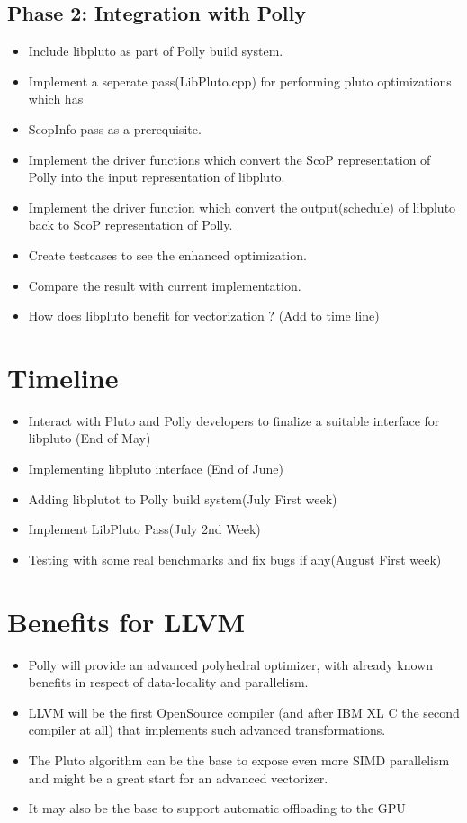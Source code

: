 \documentclass[a4paper,12pt]{article}
\begin{document}
\subsection{Phase 2: Integration with Polly}
\begin{itemize}
\item Include libpluto as part of Polly build system.
\item  Implement a seperate pass(LibPluto.cpp) for performing pluto optimizations which has
\item ScopInfo pass as a prerequisite.
\item Implement the driver functions which convert the ScoP representation
      of Polly into the input representation of libpluto.
\item Implement the driver function which convert the output(schedule) of
      libpluto back to ScoP representation of Polly.
\item Create testcases to see the enhanced optimization.
\item Compare the result with current implementation.
\item How does libpluto benefit for vectorization ? (Add to time line)
\end{itemize}

\section{Timeline}

\begin{itemize}
\item Interact with Pluto and Polly developers to finalize a suitable interface for
  libpluto (End of May)
\item Implementing libpluto interface (End of June)
\item Adding libplutot to Polly build system(July First week)
\item Implement LibPluto Pass(July 2nd Week)
\item Testing with some real benchmarks and fix bugs if any(August First week)
\end{itemize}

\section{Benefits for LLVM}

\begin{itemize}
\item Polly will provide an advanced polyhedral optimizer, with already known
  benefits in respect of data-locality and parallelism.
\item LLVM will be the first OpenSource compiler (and after IBM XL C the second compiler at all)
  that implements such advanced transformations.
\item The Pluto algorithm can be the base to expose even more SIMD parallelism
  and might be a great start for an advanced vectorizer.
\item It may also be the base to support automatic offloading to the GPU
\end{itemize}
\end{document}
